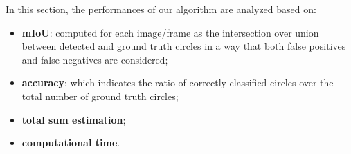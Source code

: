 
In this section, the performances of our algorithm are analyzed based on:
\begin{itemize}
    \item \textbf{mIoU}: computed for each image/frame as the intersection over union between detected and ground truth circles in a way that both false positives and false negatives are considered;
    \item \textbf{accuracy}: which indicates the ratio of correctly classified circles over the total number of ground truth circles;
    \item \textbf{total sum estimation};
    \item \textbf{computational time}.
\end{itemize}
